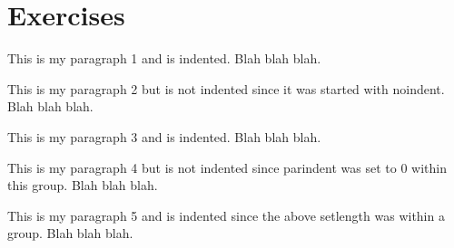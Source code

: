 \section{Exercises}

This is my paragraph 1 and is indented.  Blah blah blah.

\noindent
This is my paragraph 2 but is not indented since it was started with noindent.  Blah blah blah.

This is my paragraph 3 and is indented.  Blah blah blah.

{\setlength{\parindent}{0cm}
    This is my paragraph 4 but is not indented since parindent was set to 0 within this group.  Blah blah blah.
}

This is my paragraph 5 and is indented since the above setlength was within a group.  Blah blah blah.